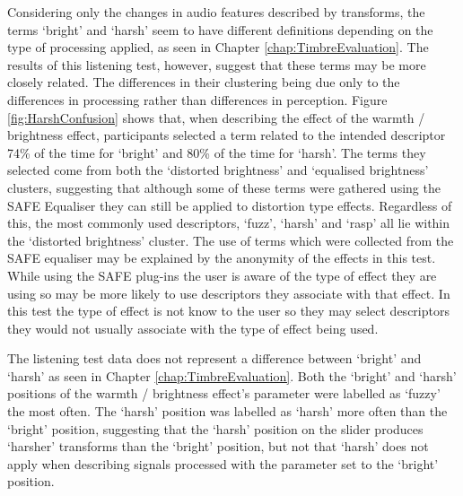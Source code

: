 			Considering only the changes in audio features described by transforms, the terms `bright' and
			`harsh' seem to have different definitions depending on the type of processing applied, as seen in
			Chapter \ref{chap:TimbreEvaluation}. The results of this listening test, however, suggest that
			these terms may be more closely related. The differences in their clustering being due only to the
			differences in processing rather than differences in perception. Figure \ref{fig:HarshConfusion}
			shows that, when describing the effect of the warmth / brightness effect, participants selected a
			term related to the intended descriptor 74\% of the time for `bright' and 80\% of the time for
			`harsh'. The terms they selected come from both the `distorted brightness' and `equalised
			brightness' clusters, suggesting that although some of these terms were gathered using the SAFE
			Equaliser they can still be applied to distortion type effects. Regardless of this, the most
			commonly used descriptors, `fuzz', `harsh' and `rasp' all lie within the `distorted brightness'
			cluster. The use of terms which were collected from the SAFE equaliser may be explained by the
			anonymity of the effects in this test. While using the SAFE plug-ins the user is aware of the type
			of effect they are using so may be more likely to use descriptors they associate with that effect.
			In this test the type of effect is not know to the user so they may select descriptors they would
			not usually associate with the type of effect being used.

			The listening test data does not represent a difference between `bright' and `harsh' as seen in
			Chapter \ref{chap:TimbreEvaluation}. Both the `bright' and `harsh' positions of the warmth /
			brightness effect's parameter were labelled as `fuzzy' the most often. The `harsh' position was
			labelled as `harsh' more often than the `bright' position, suggesting that the `harsh' position on
			the slider produces `harsher' transforms than the `bright' position, but not that `harsh' does not
			apply when describing signals processed with the parameter set to the `bright' position.
			
